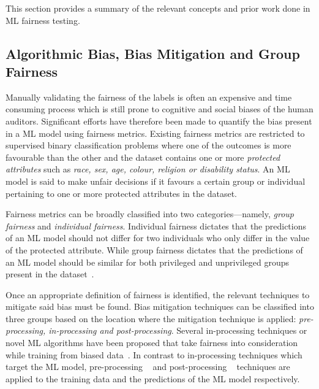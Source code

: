 \documentclass[sigconf,review,anonymous]{acmart}
\begin{document}
This section provides a summary of the relevant concepts and prior
work done in ML fairness testing.

\subsection{Algorithmic Bias, Bias Mitigation and Group Fairness}\label{sec:bias-fairness}


Manually validating the fairness of the labels is often an expensive
and time consuming process which is still prone to cognitive and
social biases of the human auditors. Significant efforts have
therefore been made to quantify the bias present in a ML model using
fairness metrics. Existing fairness metrics are restricted to
supervised binary classification problems where one of the outcomes is
more favourable than the other and the dataset contains one or more
\emph{protected attributes} such as \emph{race, sex, age, colour,
religion or disability status}. An ML model is said to make unfair
decisions if it favours a certain group or individual pertaining to
one or more protected attributes in the dataset.

Fairness metrics can be broadly classified into two
categories---namely, \emph{group fairness} and \emph{individual
fairness}. Individual fairness dictates that the predictions of an ML
model should not differ for two individuals who only differ in the
value of the protected attribute. While group fairness dictates that
the predictions of an ML model should be similar for both privileged
and unprivileged groups present in the
dataset \cite{castelnovo2022clarification,hellman2020measuring,mitchell2021algorithmic,kusner2017counterfactual,grgic2016case,dwork2012fairness,barocas2019fairness,barocas2016big,hardt2016equality,binns2018fairness,verma2018fairness,saxena2019fairness}.

Once an appropriate definition of fairness is identified, the relevant
techniques to mitigate said bias must be found. Bias mitigation
techniques can be classified into three groups based on the location
where the mitigation technique is applied: \emph{pre-processing,
in-processing and post-processing}. Several in-processing techniques
or novel ML algorithms have been proposed that take fairness into
consideration while training from biased
data \cite{zhang2018mitigating,agarwal2018reductions,kearns2018preventing,kamishima2012fairness}. In
contrast to in-processing techniques which target the ML model,
pre-processing
 \cite{feldman2015certifying,zemel2013learning,calmon2017optimized,kamiran2012data}
and post-processing
 \cite{pleiss2017fairness,hardt2016equality,kamiran2012decision}
techniques are applied to the training data and the predictions of the
ML model respectively.
\end{document}

